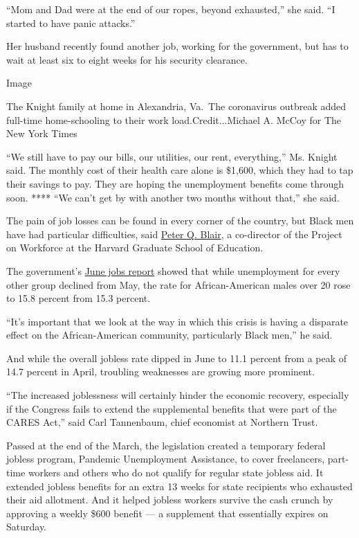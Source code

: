 ``Mom and Dad were at the end of our ropes, beyond exhausted,'' she
said. ``I started to have panic attacks.''

Her husband recently found another job, working for the government, but
has to wait at least six to eight weeks for his security clearance.

Image

The Knight family at home in Alexandria, Va.~The coronavirus outbreak
added full-time home-schooling to their work load.Credit...Michael A.
McCoy for The New York Times

``We still have to pay our bills, our utilities, our rent, everything,''
Ms. Knight said. The monthly cost of their health care alone is \$1,600,
which they had to tap their savings to pay. They are hoping the
unemployment benefits come through soon. **** ``We can't get by with
another two months without that,'' she said.

The pain of job losses can be found in every corner of the country, but
Black men have had particular difficulties, said
\href{https://www.gse.harvard.edu/faculty/peter-blair}{Peter Q. Blair},
a co-director of the Project on Workforce at the Harvard Graduate School
of Education.

The government's
\href{https://www.bls.gov/news.release/empsit.t02.htm}{June jobs report}
showed that while unemployment for every other group declined from May,
the rate for African-American males over 20 rose to 15.8 percent from
15.3 percent.

``It's important that we look at the way in which this crisis is having
a disparate effect on the African-American community, particularly Black
men,'' he said.

And while the overall jobless rate dipped in June to 11.1 percent from a
peak of 14.7 percent in April, troubling weaknesses are growing more
prominent.

``The increased joblessness will certainly hinder the economic recovery,
especially if the Congress fails to extend the supplemental benefits
that were part of the CARES Act,'' said Carl Tannenbaum, chief economist
at Northern Trust.

Passed at the end of the March, the legislation created a temporary
federal jobless program, Pandemic Unemployment Assistance, to cover
freelancers, part-time workers and others who do not qualify for regular
state jobless aid. It extended jobless benefits for an extra 13 weeks
for state recipients who exhausted their aid allotment. And it helped
jobless workers survive the cash crunch by approving a weekly \$600
benefit --- a supplement that essentially expires on Saturday.


